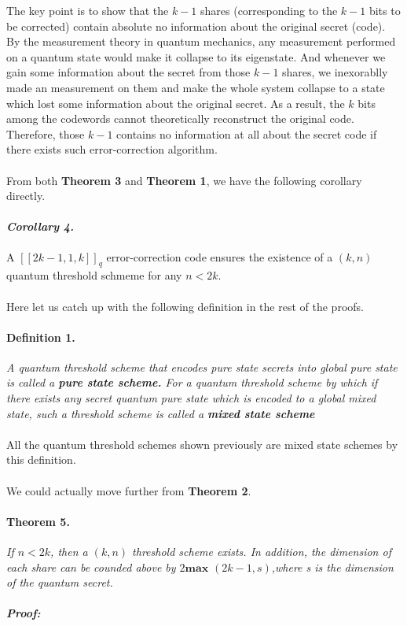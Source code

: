 \documentclass[12pt]{article}
\begin{document}
The key point is to show that the $k-1$ shares (corresponding to the $k-1$ bits to be corrected) contain absolute no information about the original secret (code). By the measurement theory in quantum mechanics, any measurement performed on a quantum state would make it collapse to its eigenstate.
And whenever we gain some information about the secret from those $k-1$ shares, we inexorablly made an measurement on them and make the whole system collapse  to a state which lost some information about the original secret.\cite{Bennett}
As a result, the $k$ bits among the codewords cannot theoretically reconstruct the original code. Therefore, those $k-1$ contains no information at all about the secret code if there exists such error-correction algorithm.
\\\\
From both \textbf{Theorem 3} and \textbf{Theorem 1}, we have the following corollary directly.
\paragraph{\textit{Corollary 4.}}
A $[[2k-1,1,k]]_q$ error-correction code ensures the existence of a $(k,n)$ quantum threshold schmeme for any $n < 2k$.
\\\\
Here let us catch up with the following definition in the rest of the proofs.

\paragraph{Definition 1.}
\textit{A quantum threshold scheme that encodes pure state secrets into global pure state is called a \textbf{pure state scheme.} 
For a quantum threshold scheme by which if there exists any secret quantum pure state which is encoded to a global mixed state, such a threshold scheme is called a \textbf{mixed state scheme}}
\\\\
All the quantum threshold schemes shown previously are mixed state schemes by this definition.
\\\\
We could actually move further from \textbf{Theorem 2}.
\paragraph{Theorem 5.}
\textit{If $n < 2k$, then a $(k,n)$ threshold scheme exists. In addition, the dimension of each share can be counded above by $2\textbf{max }(2k-1,s)$,where s is the dimension of the quantum secret.}
\paragraph{\textit{Proof:}}







\end{document}
